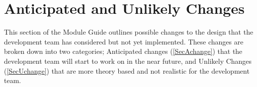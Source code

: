 \documentclass[12pt, titlepage]{article}
\begin{document}



\section{Anticipated and Unlikely Changes} \label{SecChange}
This section of the Module Guide outlines possible changes to the design that the development team has considered but not yet implemented. These changes are broken down into two categories; Anticipated changes (\ref{SecAchange}) that the development team will start to work on in the near future, and Unlikely Changes (\ref{SecUchange}) that are more theory based and not realistic for the development team.
\end{document}
